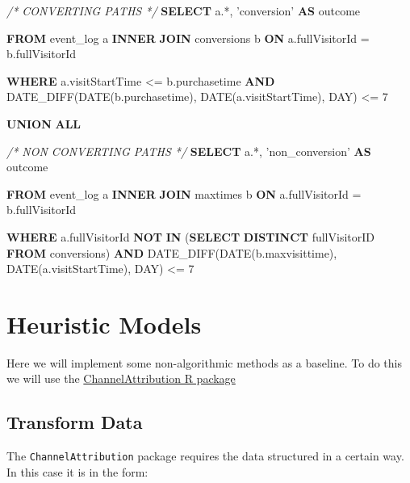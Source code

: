 \documentclass[]{book}
\newenvironment{Shaded}{\begin{snugshade}}{\end{snugshade}}
\newcommand{\KeywordTok}[1]{\textcolor[rgb]{0.13,0.29,0.53}{\textbf{#1}}}
\newcommand{\DataTypeTok}[1]{\textcolor[rgb]{0.13,0.29,0.53}{#1}}
\newcommand{\DecValTok}[1]{\textcolor[rgb]{0.00,0.00,0.81}{#1}}
\newcommand{\StringTok}[1]{\textcolor[rgb]{0.31,0.60,0.02}{#1}}
\newcommand{\CommentTok}[1]{\textcolor[rgb]{0.56,0.35,0.01}{\textit{#1}}}
\newcommand{\NormalTok}[1]{#1}
\begin{document}
\begin{Shaded}
\begin{Highlighting}[]
  \CommentTok{/* CONVERTING PATHS */}
  \KeywordTok{SELECT}\NormalTok{ a.*,}
         \StringTok{'conversion'} \KeywordTok{AS}\NormalTok{ outcome}

  \KeywordTok{FROM}\NormalTok{ event_log a}
    \KeywordTok{INNER} \KeywordTok{JOIN}\NormalTok{ conversions b }\KeywordTok{ON}\NormalTok{ a.fullVisitorId = b.fullVisitorId  }

  \KeywordTok{WHERE}\NormalTok{ a.visitStartTime <= b.purchasetime }
    \KeywordTok{AND}\NormalTok{ DATE_DIFF(}\DataTypeTok{DATE}\NormalTok{(b.purchasetime), }\DataTypeTok{DATE}\NormalTok{(a.visitStartTime), }\DataTypeTok{DAY}\NormalTok{)  <= }\DecValTok{7}

\KeywordTok{UNION} \KeywordTok{ALL}

  \CommentTok{/* NON CONVERTING PATHS */}
  \KeywordTok{SELECT}\NormalTok{ a.*,}
         \StringTok{'non_conversion'} \KeywordTok{AS}\NormalTok{ outcome}

  \KeywordTok{FROM}\NormalTok{ event_log a}
    \KeywordTok{INNER} \KeywordTok{JOIN}\NormalTok{ maxtimes b }\KeywordTok{ON}\NormalTok{ a.fullVisitorId = b.fullVisitorId }

  \KeywordTok{WHERE}\NormalTok{ a.fullVisitorId }\KeywordTok{NOT} \KeywordTok{IN}\NormalTok{ (}\KeywordTok{SELECT} \KeywordTok{DISTINCT}\NormalTok{ fullVisitorID }\KeywordTok{FROM}\NormalTok{ conversions)}
   \KeywordTok{AND}\NormalTok{  DATE_DIFF(}\DataTypeTok{DATE}\NormalTok{(b.maxvisittime), }\DataTypeTok{DATE}\NormalTok{(a.visitStartTime), }\DataTypeTok{DAY}\NormalTok{) <= }\DecValTok{7}
\end{Highlighting}
\end{Shaded}

\chapter{Heuristic Models}\label{heuristic-models}

Here we will implement some non-algorithmic methods as a baseline. To do
this we will use the
\href{https://cran.r-project.org/web/packages/ChannelAttribution}{ChannelAttribution
R package}

\hypertarget{transform-data}{\section{Transform
Data}\label{transform-data}}

The \texttt{ChannelAttribution} package requires the data structured in
a certain way. In this case it is in the form:
\end{document}
